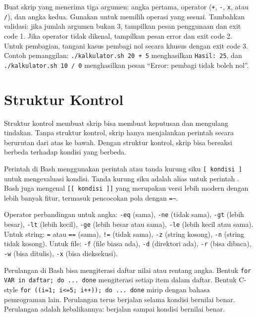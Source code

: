 \begin{challengebox}
Buat skrip  yang menerima tiga argumen: angka pertama,
operator (\texttt{+}, \texttt{-}, \texttt{x}, atau \texttt{/}), dan angka
kedua. Gunakan  untuk memilih operasi yang sesuai. Tambahkan
validasi: jika jumlah argumen bukan 3, tampilkan pesan penggunaan dan exit
code 1. Jika operator tidak dikenal, tampilkan pesan error dan exit code 2.
Untuk pembagian, tangani kasus pembagi nol secara khusus dengan exit code
3. Contoh pemanggilan: \texttt{./kalkulator.sh 20 + 5} menghasilkan
\texttt{Hasil: 25}, dan \texttt{./kalkulator.sh 10 / 0} menghasilkan
pesan ``Error: pembagi tidak boleh nol''.
\end{challengebox}

\section{Struktur Kontrol}
\label{sec:struktur-kontrol-bash}

Struktur kontrol membuat skrip bisa membuat keputusan dan mengulang
tindakan. Tanpa struktur kontrol, skrip hanya menjalankan perintah secara
berurutan dari atas ke bawah. Dengan struktur kontrol, skrip bisa
bereaksi berbeda terhadap kondisi yang berbeda.

Perintah  di Bash menggunakan perintah  atau tanda
kurung siku \texttt{[ kondisi ]} untuk mengevaluasi kondisi. Tanda
kurung siku adalah alias untuk perintah . Bash juga
mengenal \texttt{[[ kondisi ]]} yang merupakan versi lebih modern dengan
lebih banyak fitur, termasuk pencocokan pola dengan \texttt{=\textasciitilde}.

Operator perbandingan untuk angka: \texttt{-eq} (sama), \texttt{-ne}
(tidak sama), \texttt{-gt} (lebih besar), \texttt{-lt} (lebih kecil),
\texttt{-ge} (lebih besar atau sama), \texttt{-le} (lebih kecil atau sama).
Untuk string: \texttt{=} atau \texttt{==} (sama), \texttt{!=} (tidak sama),
\texttt{-z} (string kosong), \texttt{-n} (string tidak kosong).
Untuk file: \texttt{-f} (file biasa ada), \texttt{-d} (direktori ada),
\texttt{-r} (bisa dibaca), \texttt{-w} (bisa ditulis), \texttt{-x}
(bisa dieksekusi).

Perulangan  di Bash bisa mengiterasi daftar nilai atau rentang
angka. Bentuk \texttt{for VAR in daftar; do ... done} mengiterasi setiap
item dalam daftar. Bentuk C-style \texttt{for ((i=1; i<=5; i++)); do ...
done} mirip dengan bahasa pemrograman lain. Perulangan 
terus berjalan selama kondisi bernilai benar. Perulangan 
adalah kebalikannya: berjalan sampai kondisi bernilai benar.

